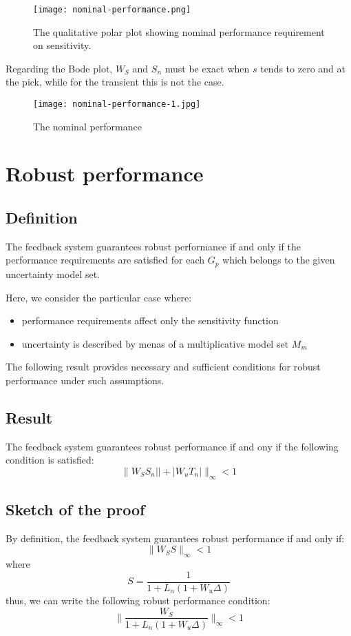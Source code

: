 \begin{figure}[H]
    \centering
    \texttt{[image: nominal-performance.png]}
    \caption{The qualitative polar plot showing nominal performance requirement on sensitivity.}
\end{figure}

Regarding the Bode plot, $W_S$ and $S_n$ must be exact when $s$ tends to zero and at the pick, while for the transient this is not the case.


\begin{figure}[H]
    \centering
    \texttt{[image: nominal-performance-1.jpg]}
    \caption{The nominal performance}
\end{figure}


\section{Robust performance}
\subsection{Definition}
The feedback system guarantees robust performance if and only if the performance requirements are satisfied for each $G_p$ which belongs to the given uncertainty model set.

Here, we consider the particular case where: 
\begin{itemize}
    \item performance requirements affect only the sensitivity function
    \item uncertainty is described by menas of a multiplicative model set $M_m$
\end{itemize}

The following result provides necessary and sufficient conditions for robust performance under such assumptions.

\subsection{Result}
The feedback system guarantees robust performance if and ony if the following condition is satisfied:
\[
\|W_SS_n||+|W_uT_n|\|_\infty < 1
\]
\subsection{Sketch of the proof}
By definition, the feedback system guarantees robust performance if and only if:
\[
\|W_SS\|_\infty < 1
\]
where
\[
S = \frac{1}{1+L_n(1+W_u\Delta)}
\]
thus, we can write the following robust performance condition:
\[
\|\frac{W_S}{1+L_n(1+W_u\Delta)}\|_\infty < 1
\]

